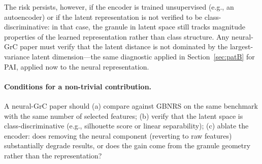 The risk persists, however, if the encoder is trained unsupervised (e.g., an
autoencoder) or if the latent representation is not verified to be
class-discriminative: in that case, the granule in latent space still tracks
magnitude properties of the learned representation rather than class structure.
Any neural-GrC paper must verify that the latent distance is not dominated by
the largest-variance latent dimension---the same diagnostic applied in
Section~\ref{sec:patB} for PAI, applied now to the neural representation.

\paragraph{Conditions for a non-trivial contribution.}
A neural-GrC paper should (a) compare against GBNRS on the same
benchmark with the same number of selected features; (b) verify that the
latent space is class-discriminative (e.g., silhouette score or linear
separability); (c) ablate the encoder: does removing the neural component
(reverting to raw features) substantially degrade results, or does the gain
come from the granule geometry rather than the representation?
